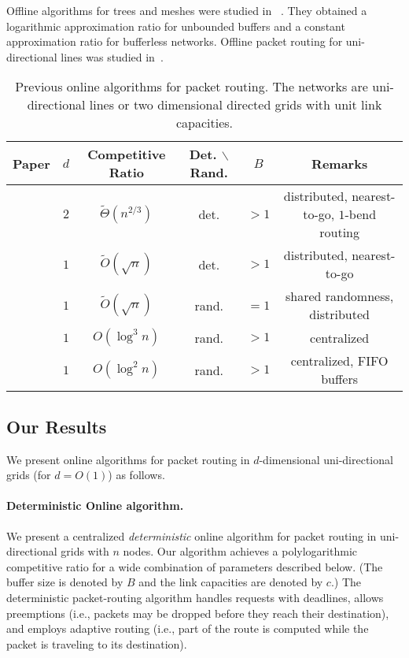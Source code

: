 \documentclass[11pt]{article}
\newenvironment{proof sketch}[1]{\noindent {\emph{Proof sketch of #1:}}}{\hfill \qed}
\begin{document}
Offline algorithms for trees and meshes were studied in~\cite{AKRR} . They obtained a
logarithmic approximation ratio for unbounded buffers and a constant approximation
ratio for bufferless networks. Offline packet routing for uni-directional lines was
studied in~\cite{RR}.

\renewcommand{\arraystretch}{1.3}
\begin{table}
\begin{centering}
\begin{tabular}{|c|c|c|c|c|c|}
\hline
Paper & $d$ & Competitive Ratio  & Det. $\backslash$ Rand.& $B$ & Remarks \tabularnewline
\hline
\hline
\cite{AKK}  & $2$ & $\tilde{\Theta}(n^{2/3})$  & det. & $>1$ &  distributed, nearest-to-go,
$1$-bend routing\tabularnewline
\cite{AKK}  & $1$ & $\tilde{O}(\sqrt{n})$  &det.  & $>1$ & distributed, nearest-to-go\tabularnewline
\cite{AKK}  & $1$ & $\tilde{O}(\sqrt{n})$  &rand.  & $=1$ & shared randomness, distributed\tabularnewline
\cite{AKK}  & $1$ & $O(\log^3 n)$  &rand.  & $>1$ &  centralized\tabularnewline
\cite{AZ}   & $1$ & $O(\log^2 n)$ & rand. &  $>1$ &  centralized, FIFO buffers\tabularnewline
\hline
\end{tabular}
\par\end{centering}
\caption{Previous online algorithms for packet routing. The networks are
  uni-directional lines or two dimensional directed grids with
  unit link capacities.}
\label{table:previous work}
\end{table}
\renewcommand{\arraystretch}{1}

\subsection{Our Results}
We present online algorithms for packet routing in
$d$-dimensional uni-directional grids (for $d=O(1)$) as
follows.

\paragraph{Deterministic Online algorithm.}
We present a centralized \emph{deterministic} online
algorithm for packet routing in uni-directional grids with
$n$ nodes. Our algorithm achieves a polylogarithmic
competitive ratio for a wide combination of parameters
described below. (The buffer size is denoted by $B$ and the
link capacities are denoted by $c$.) The deterministic
packet-routing algorithm handles requests with deadlines,
allows  preemptions (i.e., packets may be dropped before
they reach their destination), and employs adaptive routing
(i.e., part of the route is computed while the packet is
traveling to its destination).
\end{document}
